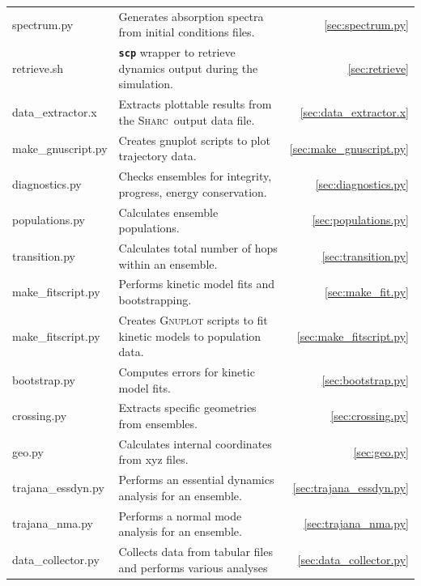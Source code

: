 \documentclass[a4paper,10pt,DIV=15,openany]{scrbook}
\newcommand{\sharc}{\textsc{Sharc}}
\newcommand{\ttt}[1]{\textbf{\texttt{#1}}}
\begin{document}
\begin{tabular}{>{\ttfamily}lp{10.5cm}r}
  spectrum.py           &Generates absorption spectra from initial conditions files.            &\ref{sec:spectrum.py}\\
  retrieve.sh           &\ttt{scp} wrapper to retrieve dynamics output during the simulation.   &\ref{sec:retrieve}\\
  data\_extractor.x     &Extracts plottable results from the \sharc\ output data file.          &\ref{sec:data_extractor.x}\\
  make\_gnuscript.py    &Creates gnuplot scripts to plot trajectory data.                       &\ref{sec:make_gnuscript.py}\\
  diagnostics.py        &Checks ensembles for integrity, progress, energy conservation.         &\ref{sec:diagnostics.py}\\
  populations.py        &Calculates ensemble populations.                                       &\ref{sec:populations.py}\\
  transition.py         &Calculates total number of hops within an ensemble.                    &\ref{sec:transition.py}\\
  make\_fitscript.py    &Performs kinetic model fits and bootstrapping.                         &\ref{sec:make_fit.py}\\
  make\_fitscript.py    &Creates \textsc{Gnuplot} scripts to fit kinetic models to population data.      &\ref{sec:make_fitscript.py}\\
  bootstrap.py          &Computes errors for kinetic model fits.                                &\ref{sec:bootstrap.py}\\
  crossing.py           &Extracts specific geometries from ensembles.                           &\ref{sec:crossing.py}\\
  geo.py                &Calculates internal coordinates from xyz files.                        &\ref{sec:geo.py}\\
  trajana\_essdyn.py    &Performs an essential dynamics analysis for an ensemble.               &\ref{sec:trajana_essdyn.py}\\
  trajana\_nma.py       &Performs a normal mode analysis for an ensemble.                       &\ref{sec:trajana_nma.py}\\
  data\_collector.py    &Collects data from tabular files and performs various analyses         &\ref{sec:data_collector.py}\\
\end{tabular}
\end{document}
